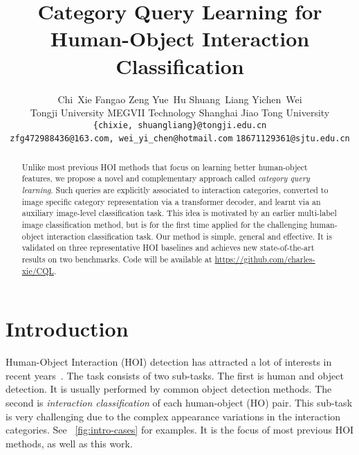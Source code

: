 \documentclass[10pt,twocolumn,letterpaper]{article}
\begin{document}
\title{Category Query Learning for Human-Object Interaction Classification}

\author{
Chi~Xie\footnotemark[2] \quad
Fangao Zeng\footnotemark[3] \quad
Yue~Hu\footnotemark[3] \quad
Shuang~Liang\footnotemark[1] \quad
Yichen~Wei\footnotemark[3] \\
{Tongji University} \quad
{MEGVII Technology} \quad
{Shanghai Jiao Tong University} \\
{\tt\small \{chixie, shuangliang\}@tongji.edu.cn} \\ \quad
{\tt\small zfg472988436@163.com, wei\_yi\_chen@hotmail.com} \quad
{\tt\small 18671129361@sjtu.edu.cn} \\
}

\maketitle

\renewcommand{\thefootnote}{\fnsymbol{footnote}}

\begin{abstract}
Unlike most previous HOI methods that focus on learning better human-object features, we propose a novel and complementary approach called \emph{category query learning}. Such queries are explicitly associated to interaction categories, converted to image specific category representation via a transformer decoder, and learnt via an auxiliary image-level classification task. This idea is motivated by an earlier multi-label image classification method, but is for the first time applied for the challenging human-object interaction classification task. Our method is simple, general and effective. It is validated on three representative HOI baselines and achieves new state-of-the-art results on two benchmarks. Code will be available at \url{https://github.com/charles-xie/CQL}.
\end{abstract}

\section{Introduction}
\label{sec:intro}
Human-Object Interaction (HOI) detection has attracted a lot of interests in recent years~\cite{gupta2015visual, chao2018learning, gkioxari2018detecting, gao2018ican, liao2020ppdm, tamura2021qpic}. The task consists of two sub-tasks. The first is human and object detection. It is usually performed by common object detection methods. The second is \emph{interaction classification} of each human-object (HO) pair. This sub-task is very challenging due to the complex appearance variations in the interaction categories. See ~\cref{fig:intro-cases} for examples. It is the focus of most previous HOI methods, as well as this work.
\end{document}
